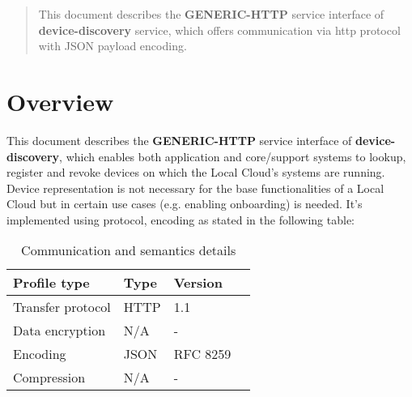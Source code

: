 \documentclass[a4paper]{arrowhead}
\begin{document}
\ArrowheadDate{\today}
\ArrowheadSetup

\begin{center}
  \vspace*{1cm}
  \huge{\arrowtitle}

  \vspace*{0.2cm}
  \LARGE{\arrowtype}
  \vspace*{1cm}
\end{center}

  \vspace*{\fill}


  \vspace*{1cm}
  \vspace*{\fill}

  \begin{abstract}
    This document describes the \textbf{GENERIC-HTTP} service interface of \textbf{device-discovery} service, which offers communication via http protocol with JSON payload encoding.
  \end{abstract}
  \vspace*{1cm}

\newpage

\tableofcontents
\newpage

\section{Overview}
\label{sec:overview}

This document describes the \textbf{GENERIC-HTTP} service interface of \textbf{device-discovery}, which enables both application and core/support systems to lookup, register and revoke devices on which the Local Cloud’s systems are running. Device representation is not necessary for the base functionalities of a Local Cloud but in certain use cases (e.g.
enabling onboarding) is needed. It's implemented using protocol, encoding as stated in the following table:

\begin{table}[ht!]
  \centering
  \begin{tabular}{|l|l|l|l|}
    \rowcolor{gray!33} Profile type & Type & Version \\ \hline
    Transfer protocol & HTTP & 1.1 \\ \hline
    Data encryption & N/A & - \\ \hline
    Encoding & JSON & RFC 8259 \cite{rfc8259} \\ \hline
    Compression & N/A & - \\ \hline
  \end{tabular}
  \caption{Communication and semantics details}
  \label{tab:comunication_semantics_profile}
\end{table}
\end{document}
